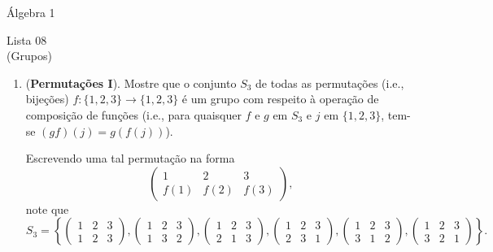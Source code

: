 \documentclass[a4paper,12pt]{article}
\begin{document}
\begin{center}
    \large Álgebra 1
\end{center}

\begin{center}
    \large Lista 08 \\
    \small (Grupos)
\end{center}
  
\begin{enumerate}[label=8.\arabic*.]

    \item (\textbf{Permutações I}). Mostre que o conjunto $S_3$ de todas as permutações (i.e., bijeções) 
    $f: \{1,2,3\} \to \{1,2,3\}$ é um grupo com respeito à operação de composição de funções (i.e., para quaisquer $f$ e $g$ em $S_3$ e $j$ em $\{1,2,3\}$, tem-se $(gf)(j) = g(f(j))$). 

    Escrevendo uma tal permutação na forma 
    \[
    \begin{pmatrix} 
        1 & 2 & 3 \\ 
        f(1) & f(2) & f(3) 
    \end{pmatrix},
    \] 
    note que 
    \[
    S_3 = \left\{ 
    \begin{pmatrix}1&2&3\\1&2&3\end{pmatrix}, 
    \begin{pmatrix}1&2&3\\1&3&2\end{pmatrix}, 
    \begin{pmatrix}1&2&3\\2&1&3\end{pmatrix}, 
    \begin{pmatrix}1&2&3\\2&3&1\end{pmatrix}, 
    \begin{pmatrix}1&2&3\\3&1&2\end{pmatrix}, 
    \begin{pmatrix}1&2&3\\3&2&1\end{pmatrix} 
    \right\}.
    \] 


\end{enumerate}
\end{document}
